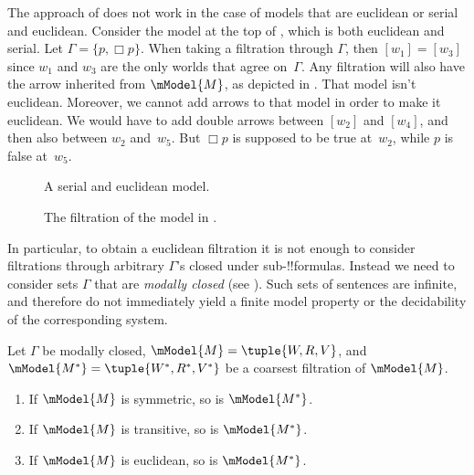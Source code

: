 \documentclass[../../../include/open-logic-section]{subfiles}
\begin{document}

The approach of  does not work in the case of models
that are euclidean or serial and euclidean. Consider the model at the
top of , which is both euclidean and serial. Let
$\Gamma = \{p, \Box p \}$. When taking a filtration through $\Gamma$,
then $[w_1] = [w_3]$ since $w_1$ and $w_3$ are the only worlds that
agree on~$\Gamma$. Any filtration will also have the arrow inherited
from $\mModel{M}$, as depicted in . That model
isn't euclidean. Moreover, we cannot add arrows to that model in order
to make it euclidean. We would have to add double arrows between
$[w_2]$ and $[w_4]$, and then also between $w_2$ and~$w_5$. But $\Box
p$ is supposed to be true at~$w_2$, while $p$ is false at~$w_5$.

\begin{figure}[htpb]
  \centering
  \caption{A serial and euclidean model.}
\end{figure}

\begin{figure}[ht]
  \centering
  \caption{The filtration of the model in .}
\end{figure}

In particular, to obtain a euclidean filtration it is not enough to
consider filtrations through arbitrary $\Gamma$'s closed under
sub-!!{formula}s. Instead we need to consider sets $\Gamma$ that are
\emph{modally closed} (see ). Such sets
of sentences are infinite, and therefore do not immediately yield a
finite model property or the decidability of the corresponding system.

\begin{thm}
  Let $\Gamma$ be modally closed, $\mModel{M}=\tuple{W,R,V}$, and
  $\mModel{M^*} = \tuple{W^*,R^*,V^*}$ be a coarsest filtration of
  $\mModel{M}$.
  \begin{enumerate}
  \item If $\mModel{M}$ is symmetric, so is $\mModel{M^*}$.
  \item If $\mModel{M}$ is transitive, so is $\mModel{M^*}$.
  \item If $\mModel{M}$ is euclidean, so is $\mModel{M^*}$.
  \end{enumerate}
\end{thm}
\end{document}
